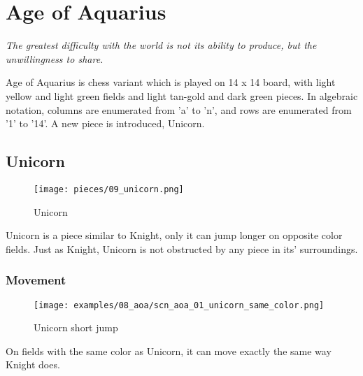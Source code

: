 
\chapter*{Age of Aquarius}

\begin{flushright}
\parbox{0.8\textwidth}{
\emph{The greatest difficulty with the world is not its ability to produce, but the unwillingness to share. \\
 } }
\end{flushright}

\noindent
Age of Aquarius is chess variant which is played on 14 x 14 board,
with light yellow and light green fields and light tan-gold and
dark green pieces. In algebraic notation, columns are enumerated
from 'a' to 'n', and rows are enumerated from '1' to '14'. A new
piece is introduced, Unicorn.

\clearpage %

\section*{Unicorn}

\noindent
\begin{wrapfigure}[5]{l}{0.4\textwidth}
\centering
\texttt{[image: pieces/09\_unicorn.png]}
\caption{Unicorn}
\label{fig:09_unicorn}
\end{wrapfigure}
Unicorn is a piece similar to Knight, only it can jump longer on
opposite color fields. Just as Knight, Unicorn is not obstructed
by any piece in its' surroundings.

\vspace{7\baselineskip}
\subsection*{Movement}

\noindent
\begin{wrapfigure}{l}{0.4\textwidth}
\centering
\texttt{[image: examples/08\_aoa/scn\_aoa\_01\_unicorn\_same\_color.png]}
\caption{Unicorn short jump}
\label{fig:scn_aoa_01_unicorn_same_color}
\end{wrapfigure}
On fields with the same color as Unicorn, it can move exactly the
same way Knight does.

